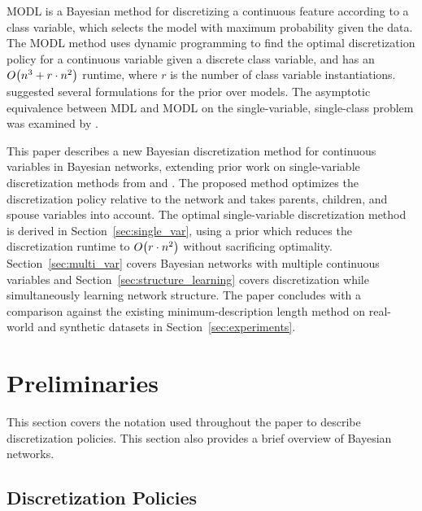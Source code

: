 \documentclass[twoside,11pt]{article}
\newcommand{\citep}[1]{\cite{#1}}
\newcommand{\citet}[1]{\citeauthor{#1} \citeyear{#1}}
\newcommand{\bigo}{O} %
\newcommand{\paren}[1]{\mathopen{}\mathclose\bgroup\left(#1\aftergroup\egroup\right)}
\begin{document}
MODL \citep{Boulle_2006} is a Bayesian method for discretizing a continuous feature according to a class variable, which selects the model with maximum probability given the data.
The MODL method uses dynamic programming to find the optimal discretization policy for a continuous variable given a discrete class variable, and has an $\bigo\paren{n^3 + r \cdot n^2}$ runtime, where $r$ is the number of class variable instantiations.
\citet{Lustgarten_2011} suggested several formulations for the prior over models. The asymptotic equivalence between MDL and MODL on the single-variable, single-class problem was examined by \citet{VL_2000}.

This paper describes a new Bayesian discretization method for continuous variables in Bayesian networks, extending prior work on single-variable discretization methods from \citet{Boulle_2006} and \citet{Lustgarten_2011}.
The proposed method optimizes the discretization policy relative to the network and takes parents, children, and spouse variables into account.
The optimal single-variable discretization method is derived in Section~\ref{sec:single_var}, using a prior which reduces the discretization runtime to $\bigo\paren{r \cdot n^2}$ without sacrificing optimality.
Section~\ref{sec:multi_var} covers Bayesian networks with multiple continuous variables and Section~\ref{sec:structure_learning} covers discretization while simultaneously learning network structure.
The paper concludes with a comparison against the existing minimum-description length \citep{Friedman_1996} method on real-world and synthetic datasets in Section~\ref{sec:experiments}.


\section{Preliminaries}
\label{sec:preliminaries}
This section covers the notation used throughout the paper to describe discretization policies.
This section also provides a brief overview of Bayesian networks.

\subsection{Discretization Policies}
\label{subsec:disc_policy}
\end{document}
